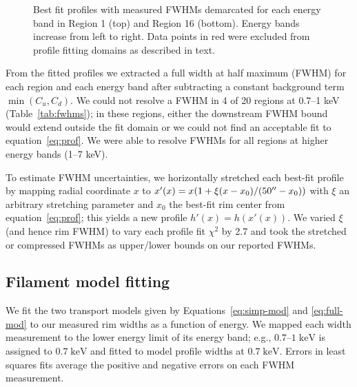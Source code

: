 \documentclass[iop, apj, numberedappendix, twocolappendix]{emulateapj}
\newcommand*{\mt}{\mathrm}
\newcommand*{\unit}[1]{\;\mt{#1}}  %
\begin{document}
\begin{figure*}[ht]
    \caption{Best fit profiles with measured FWHMs demarcated for each energy
        band in Region 1 (top) and Region 16 (bottom).  Energy bands increase
        from left to right.  Data points in red were excluded from profile
        fitting domains as described in text.}
    \label{fig:profiles}
\end{figure*}

From the fitted profiles we extracted a full width at half maximum (FWHM) for
each region and each energy band after subtracting a constant background term
$\min(C_u, C_d)$.  We could not resolve a FWHM in 4 of 20 regions at 0.7--1 keV
(Table~\ref{tab:fwhms}); in these regions, either the downstream FWHM bound
would extend outside the fit domain or we could not find an acceptable fit to
equation~\eqref{eq:prof}.  We were able to resolve FWHMs for all regions at
higher energy bands (1--7 keV).

To estimate FWHM uncertainties, we horizontally stretched each best-fit
profile by mapping radial coordinate $x$ to
$x'(x) = x (1 + \xi (x-x_0)/(50\mbox{$^{\prime\prime}$}-x_0))$ with $\xi$ an arbitrary stretching
parameter and $x_0$ the best-fit rim center from equation~\eqref{eq:prof};
this yields a new profile $h'(x) = h(x'(x))$.
We varied $\xi$ (and hence rim FWHM) to vary each profile fit $\chi^2$ by 2.7
and took the stretched or compressed FWHMs as upper/lower bounds on our
reported FWHMs.

\subsection{Filament model fitting}
\label{sec:fits}

We fit the two transport models given by Equations~\eqref{eq:simp-mod} and
\eqref{eq:full-mod} to our measured rim widths as a function of energy.
We mapped each width measurement to the lower energy limit of its energy band;
e.g., $0.7$--$1 \unit{keV}$ is assigned to $0.7 \unit{keV}$ and fitted to
model profile widths at $0.7 \unit{keV}$.  Errors in least squares fits
average the positive and negative errors on each FWHM measurement.
\end{document}
